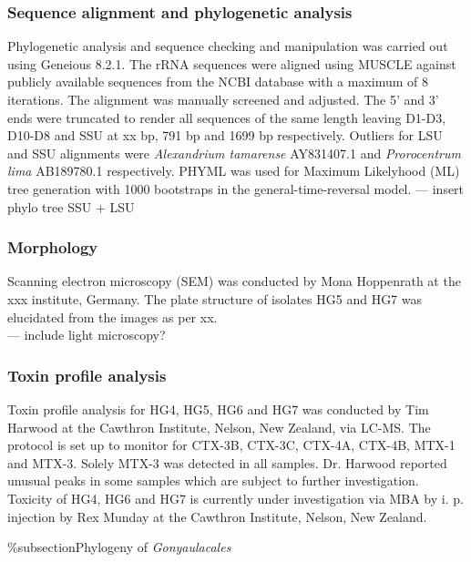 \documentclass[12pt]{article}
\begin{document}
\subsubsection{Sequence alignment and phylogenetic analysis}
Phylogenetic analysis and sequence checking and manipulation was carried out using Geneious 8.2.1.
The rRNA sequences were aligned using MUSCLE against publicly available sequences from the NCBI database with a maximum of 8 iterations. The alignment was manually screened and adjusted. The 5' and 3' ends were truncated to render all sequences of the same length leaving D1-D3, D10-D8 and SSU at xx bp, 791 bp and 1699 bp respectively. Outliers for LSU and SSU alignments were \emph{Alexandrium tamarense} AY831407.1 and \emph{Prorocentrum lima} AB189780.1 respectively.
PHYML was used for Maximum Likelyhood (ML) tree generation with 1000 bootstraps in the general-time-reversal model.
--- insert phylo tree SSU + LSU

\subsubsection{Morphology}
Scanning electron microscopy (SEM) was conducted by Mona Hoppenrath at the xxx institute, Germany. The plate structure of isolates HG5 and HG7 was elucidated from the images as per xx.\\
--- include light microscopy?

\subsubsection{Toxin profile analysis}
Toxin profile analysis for HG4, HG5, HG6 and HG7 was conducted by Tim Harwood at the Cawthron Institute, Nelson, New Zealand, via LC-MS. The protocol is set up to monitor for CTX-3B, CTX-3C, CTX-4A, CTX-4B, MTX-1 and MTX-3. Solely MTX-3 was detected in all samples. Dr. Harwood reported unusual peaks in some samples which are subject to further investigation. \\
Toxicity of HG4, HG6 and HG7 is currently under investigation via MBA by i. p. injection by Rex Munday at the Cawthron Institute, Nelson, New Zealand.
 

\%subsection{Phylogeny of \emph{Gonyaulacales}}
\end{document}
